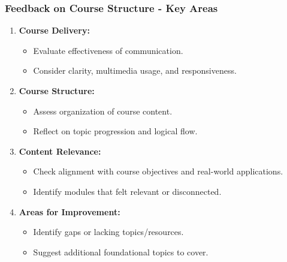 \documentclass[aspectratio=169]{beamer}
\begin{document}
\begin{frame}[fragile]
    \frametitle{Feedback on Course Structure - Key Areas}
    \begin{enumerate}
        \item \textbf{Course Delivery:}
            \begin{itemize}
                \item Evaluate effectiveness of communication.
                \item Consider clarity, multimedia usage, and responsiveness.
            \end{itemize}
            
        \item \textbf{Course Structure:}
            \begin{itemize}
                \item Assess organization of course content.
                \item Reflect on topic progression and logical flow.
            \end{itemize}
            
        \item \textbf{Content Relevance:}
            \begin{itemize}
                \item Check alignment with course objectives and real-world applications.
                \item Identify modules that felt relevant or disconnected.
            \end{itemize}

        \item \textbf{Areas for Improvement:}
            \begin{itemize}
                \item Identify gaps or lacking topics/resources.
                \item Suggest additional foundational topics to cover.
            \end{itemize}
    \end{enumerate}
\end{frame}
\end{document}
